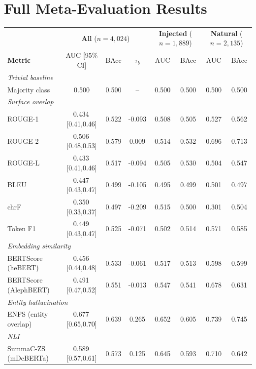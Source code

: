 \documentclass[11pt]{article}
\begin{document}
\section{Full Meta-Evaluation Results}
\label{app:full_results}
\begin{table}[t]
\centering
\small
\setlength{\tabcolsep}{5pt}
\begin{tabular}{lccc|cc|cc}
\toprule
 & \multicolumn{3}{c|}{\textbf{All} ($n{=}4{,}024$)} & \multicolumn{2}{c|}{\textbf{Injected} ($n{=}1{,}889$)} & \multicolumn{2}{c}{\textbf{Natural} ($n{=}2{,}135$)} \\
\textbf{Metric} & AUC [95\% CI] & BAcc & $\tau_b$ & AUC & BAcc & AUC & BAcc \\
\midrule
\multicolumn{8}{l}{\textit{Trivial baseline}} \\
Majority class & 0.500 & 0.500 & -- & 0.500 & 0.500 & 0.500 & 0.500 \\
\multicolumn{8}{l}{\textit{Surface overlap}} \\
ROUGE-1 & 0.434\,{\scriptsize[0.41,0.46]} & 0.522 & -0.093 & 0.508 & 0.505 & 0.527 & 0.562 \\
ROUGE-2 & 0.506\,{\scriptsize[0.48,0.53]} & 0.579 & 0.009 & 0.514 & 0.532 & 0.696 & 0.713 \\
ROUGE-L & 0.433\,{\scriptsize[0.41,0.46]} & 0.517 & -0.094 & 0.505 & 0.530 & 0.504 & 0.547 \\
BLEU & 0.447\,{\scriptsize[0.43,0.47]} & 0.499 & -0.105 & 0.495 & 0.499 & 0.501 & 0.497 \\
chrF & 0.350\,{\scriptsize[0.33,0.37]} & 0.497 & -0.209 & 0.515 & 0.500 & 0.301 & 0.504 \\
Token F1 & 0.449\,{\scriptsize[0.43,0.47]} & 0.525 & -0.071 & 0.502 & 0.514 & 0.571 & 0.585 \\
\multicolumn{8}{l}{\textit{Embedding similarity}} \\
BERTScore (heBERT) & 0.456\,{\scriptsize[0.44,0.48]} & 0.533 & -0.061 & 0.517 & 0.513 & 0.598 & 0.599 \\
BERTScore (AlephBERT) & 0.491\,{\scriptsize[0.47,0.52]} & 0.551 & -0.013 & 0.547 & 0.541 & 0.678 & 0.631 \\
\multicolumn{8}{l}{\textit{Entity hallucination}} \\
ENFS (entity overlap) & 0.677\,{\scriptsize[0.65,0.70]} & 0.639 & 0.265 & 0.652 & 0.605 & 0.739 & 0.745 \\
\multicolumn{8}{l}{\textit{NLI}} \\
SummaC-ZS (mDeBERTa) & 0.589\,{\scriptsize[0.57,0.61]} & 0.573 & 0.125 & 0.645 & 0.593 & 0.710 & 0.642 \\

\end{tabular}
\end{table}
\end{document}
